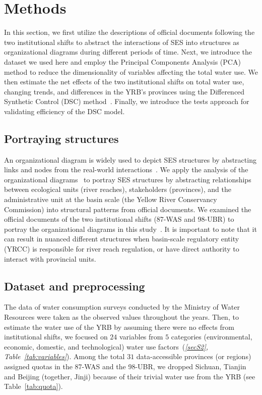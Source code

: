 \documentclass[preprint, 12pt]{elsarticle}
\begin{document}
\section{Methods}\label{sec:methods}


In this section, we first utilize the descriptions of official documents following the two institutional shifts to abstract the interactions of SES into structures as organizational diagrams during different periods of time.
Next, we introduce the dataset we used here and employ the Principal Components Analysis (PCA) method to reduce the dimensionality of variables affecting the total water use.
We then estimate the net effects of the two institutional shifts on total water use, changing trends, and differences in the YRB's provinces using the Differenced Synthetic Control (DSC) method~\cite{arkhangelsky2021}.
Finally, we introduce the tests approach for validating efficiency of the DSC model.


\subsection{Portraying structures}\label{sec:structures}

An organizational diagram is widely used to depict SES structures by abstracting links and nodes from the real-world interactions~\cite{wang2022g,bodin2017a,kluger2020,guerrero2015}.
We apply the analysis of the organizational diagrams~\cite{bodin2017b} to portray SES structures by abstracting relationships between ecological units (river reaches), stakeholders (provinces), and the administrative unit at the basin scale (the Yellow River Conservancy Commission) into structural patterns from official documents.
We examined the official documents of the two institutional shifts (87-WAS and 98-UBR) to portray the organizational diagrams in this study~\cite{bodin2017a,kluger2020,guerrero2015}.
It is important to note that it can result in nuanced different structures when basin-scale regulatory entity (YRCC) is responsible for river reach regulation, or have direct authority to interact with provincial units.

\subsection{Dataset and preprocessing}\label{sec:dataset}
The data of water consumption surveys conducted by the Ministry of Water Resources were taken as the observed values throughout the years.
Then, to estimate the water use of the YRB by assuming there were no effects from institutional shifts, we focused on $24$ variables from $5$ categories (environmental, economic, domestic, and technological) water use factors~(\textit{\ref{secS2}, Table~\ref{tab:variables}}).
Among the total $31$ data-accessible provinces (or regions) assigned quotas in the 87-WAS and the 98-UBR, we dropped Sichuan, Tianjin and Beijing (together, Jinji) because of their trivial water use from the YRB (see Table~\ref{tab:quota}).
\end{document}

